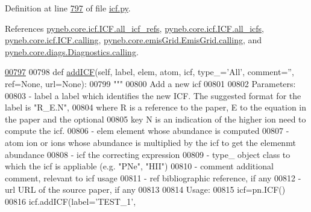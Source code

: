 Definition at line \hyperlink{icf_8py_source_l00797}{797} of file \hyperlink{icf_8py_source}{icf.\-py}.



References \hyperlink{icf_8py_source_l00680}{pyneb.\-core.\-icf.\-I\-C\-F.\-all\-\_\-icf\-\_\-refs}, \hyperlink{icf_8py_source_l00023}{pyneb.\-core.\-icf.\-I\-C\-F.\-all\-\_\-icfs}, \hyperlink{icf_8py_source_l00016}{pyneb.\-core.\-icf.\-I\-C\-F.\-calling}, \hyperlink{emis_grid_8py_source_l00044}{pyneb.\-core.\-emis\-Grid.\-Emis\-Grid.\-calling}, and \hyperlink{diags_8py_source_l00169}{pyneb.\-core.\-diags.\-Diagnostics.\-calling}.


\begin{DoxyCode}
\hypertarget{classpyneb_1_1core_1_1icf_1_1_i_c_f_l00797}{}\hyperlink{classpyneb_1_1core_1_1icf_1_1_i_c_f_a73cd32a765aaeaf1ac3dac231e9f0a72}{00797} 
00798     \textcolor{keyword}{def }\hyperlink{classpyneb_1_1core_1_1icf_1_1_i_c_f_a73cd32a765aaeaf1ac3dac231e9f0a72}{addICF}(self, label, elem, atom, icf, type\_='All', comment='', ref=None, url=None):
00799         \textcolor{stringliteral}{"""}
00800 \textcolor{stringliteral}{        Add a new icf}
00801 \textcolor{stringliteral}{        }
00802 \textcolor{stringliteral}{        Parameters:}
00803 \textcolor{stringliteral}{            - label    a label which identifies the new ICF. The suggested format for the label is "R\_E.N",
       }
00804 \textcolor{stringliteral}{                        where R is a reference to the paper, E to the equation in the paper and the
       optional }
00805 \textcolor{stringliteral}{                        key N is an indication of the higher ion need to compute the icf.  }
00806 \textcolor{stringliteral}{            - elem     element whose abundance is computed}
00807 \textcolor{stringliteral}{            - atom     ion or ions whose abundance is multiplied by the icf to get the elemenmt abundance}
00808 \textcolor{stringliteral}{            - icf      the correcting expression}
00809 \textcolor{stringliteral}{            - type\_     object class to which the icf is appliable (e.g. "PNe", "HII")}
00810 \textcolor{stringliteral}{            - comment  additional comment, relevant to icf usage}
00811 \textcolor{stringliteral}{            - ref      bibliographic reference, if any}
00812 \textcolor{stringliteral}{            - url      URL of the source paper, if any}
00813 \textcolor{stringliteral}{            }
00814 \textcolor{stringliteral}{        Usage:}
00815 \textcolor{stringliteral}{            icf=pn.ICF()}
00816 \textcolor{stringliteral}{            icf.addICF(label='TEST\_1',}

\end{DoxyCode}
